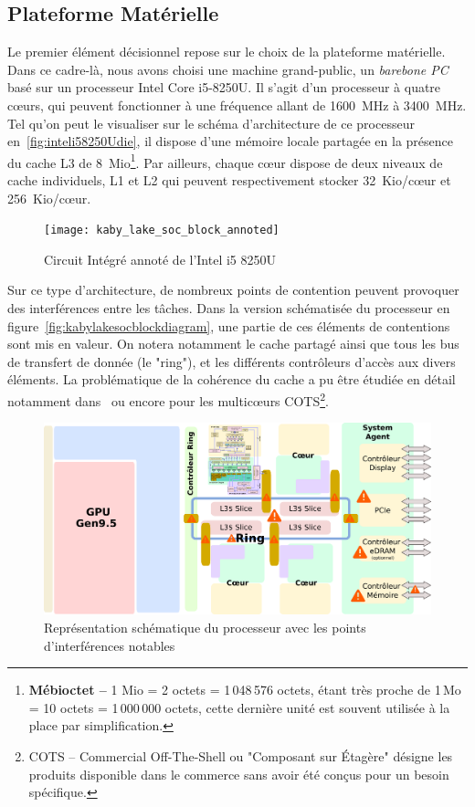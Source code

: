 \documentclass[french, a4paper, 11pt, twoside, pdftex]{StyleThese}
\begin{document}
        \subsection{Plateforme Matérielle}
        	Le premier élément décisionnel repose sur le choix de la plateforme matérielle. Dans ce cadre-là, nous avons choisi une machine grand-public, un \textit{barebone PC} basé sur un processeur Intel Core i5-8250U. Il s'agit d'un processeur à quatre cœurs, qui peuvent fonctionner à une fréquence allant de 1600~MHz à 3400~MHz. Tel qu'on peut le visualiser sur le schéma d'architecture de ce processeur en~\autoref{fig:inteli58250Udie}, il dispose d'une mémoire locale partagée en la présence du cache L3 de 8~Mio\footnote{\textbf{Mébioctet -- }1 Mio = 2 octets = 1\,048\,576 octets, étant très proche de 1\,Mo = 10 octets = 1\,000\,000 octets, cette dernière unité est souvent utilisée à la place par simplification.}. Par ailleurs, chaque cœur dispose de deux niveaux de cache individuels, L1 et L2 qui peuvent respectivement stocker 32~Kio/cœur et 256~Kio/cœur. 
       	\begin{figure}[ht]
       		\centering
       		\texttt{[image: kaby\_lake\_soc\_block\_annoted]} %
       		\caption{Circuit Intégré annoté de l'Intel i5 8250U}
       		\label{fig:inteli58250Udie}
       	\end{figure}
       
        	Sur ce type d'architecture, de nombreux points de contention peuvent provoquer des interférences entre les tâches. Dans la version schématisée du processeur en figure~\autoref{fig:kabylakesocblockdiagram}, une partie de ces éléments de contentions sont mis en valeur. On notera notamment le cache partagé ainsi que tous les bus de transfert de donnée (le "ring"), et les différents contrôleurs d'accès aux divers éléments. La problématique de la cohérence du cache a pu être étudiée en détail notamment dans~\cite{sensfelder_modeling_2019} ou encore \cite{boniol_identification_2019} pour les multicœurs COTS\footnote{COTS -- Commercial Off-The-Shell ou "Composant sur Étagère" désigne les produits disponible dans le commerce sans avoir été conçus pour un besoin spécifique.}.
        	
		\begin{figure}[ht]
			\centering
			\includegraphics[width=\linewidth]{schemas/kaby_lake_soc_block_diagram}
			\captionsetup{justification=centering}
			\caption{Représentation schématique du processeur avec les points d'interférences notables}
			\label{fig:kabylakesocblockdiagram}
		\end{figure}
	
\end{document}
